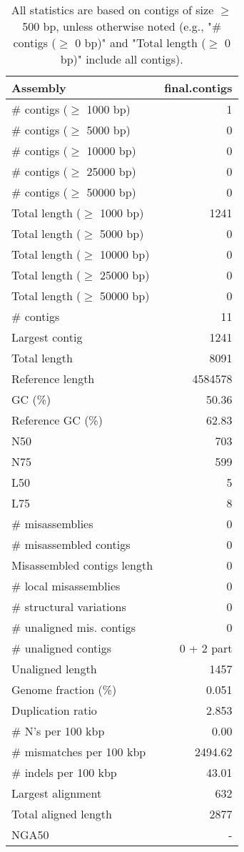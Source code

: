 \documentclass[12pt,a4paper]{article}
\begin{document}
\begin{table}[ht]
\begin{center}
\caption{All statistics are based on contigs of size $\geq$ 500 bp, unless otherwise noted (e.g., "\# contigs ($\geq$ 0 bp)" and "Total length ($\geq$ 0 bp)" include all contigs).}
\begin{tabular}{|l*{1}{|r}|}
\hline
Assembly & final.contigs \\ \hline
\# contigs ($\geq$ 1000 bp) & 1 \\ \hline
\# contigs ($\geq$ 5000 bp) & 0 \\ \hline
\# contigs ($\geq$ 10000 bp) & 0 \\ \hline
\# contigs ($\geq$ 25000 bp) & 0 \\ \hline
\# contigs ($\geq$ 50000 bp) & 0 \\ \hline
Total length ($\geq$ 1000 bp) & 1241 \\ \hline
Total length ($\geq$ 5000 bp) & 0 \\ \hline
Total length ($\geq$ 10000 bp) & 0 \\ \hline
Total length ($\geq$ 25000 bp) & 0 \\ \hline
Total length ($\geq$ 50000 bp) & 0 \\ \hline
\# contigs & 11 \\ \hline
Largest contig & 1241 \\ \hline
Total length & 8091 \\ \hline
Reference length & 4584578 \\ \hline
GC (\%) & 50.36 \\ \hline
Reference GC (\%) & 62.83 \\ \hline
N50 & 703 \\ \hline
N75 & 599 \\ \hline
L50 & 5 \\ \hline
L75 & 8 \\ \hline
\# misassemblies & 0 \\ \hline
\# misassembled contigs & 0 \\ \hline
Misassembled contigs length & 0 \\ \hline
\# local misassemblies & 0 \\ \hline
\# structural variations & 0 \\ \hline
\# unaligned mis. contigs & 0 \\ \hline
\# unaligned contigs & 0 + 2 part \\ \hline
Unaligned length & 1457 \\ \hline
Genome fraction (\%) & 0.051 \\ \hline
Duplication ratio & 2.853 \\ \hline
\# N's per 100 kbp & 0.00 \\ \hline
\# mismatches per 100 kbp & 2494.62 \\ \hline
\# indels per 100 kbp & 43.01 \\ \hline
Largest alignment & 632 \\ \hline
Total aligned length & 2877 \\ \hline
NGA50 & - \\ \hline
\end{tabular}
\end{center}
\end{table}
\end{document}
